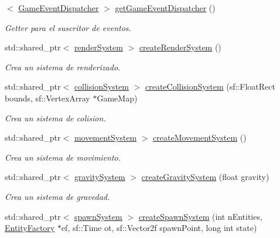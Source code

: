 \begin{DoxyCompactItemize}
$<$ \hyperlink{classant_1_1_game_event_dispatcher}{Game\+Event\+Dispatcher} $>$ \hyperlink{classant_1_1_system_factory_a33d785d8400849461d1e734c472308b4}{get\+Game\+Event\+Dispatcher} ()
\begin{DoxyCompactList}\small\item\em Getter para el suscritor de eventos. \end{DoxyCompactList}\item 
std\+::shared\+\_\+ptr$<$ \hyperlink{classant_1_1render_system}{render\+System} $>$ \hyperlink{classant_1_1_system_factory_a3d6ae5e15504796eab9f0ebd13cae354}{create\+Render\+System} ()
\begin{DoxyCompactList}\small\item\em Crea un sistema de renderizado. \end{DoxyCompactList}\item 
std\+::shared\+\_\+ptr$<$ \hyperlink{classant_1_1collision_system}{collision\+System} $>$ \hyperlink{classant_1_1_system_factory_aa962a3076d677e7ea258897cdefabd1e}{create\+Collision\+System} (sf\+::\+Float\+Rect bounds, sf\+::\+Vertex\+Array $\ast$Game\+Map)
\begin{DoxyCompactList}\small\item\em Crea un sistema de colision. \end{DoxyCompactList}\item 
std\+::shared\+\_\+ptr$<$ \hyperlink{classant_1_1movement_system}{movement\+System} $>$ \hyperlink{classant_1_1_system_factory_a69b79fce62ccf901996515e4528bc71d}{create\+Movement\+System} ()
\begin{DoxyCompactList}\small\item\em Crea un sistema de movimiento. \end{DoxyCompactList}\item 
std\+::shared\+\_\+ptr$<$ \hyperlink{classant_1_1gravity_system}{gravity\+System} $>$ \hyperlink{classant_1_1_system_factory_ae1012e7048bee97688a0db2f76723322}{create\+Gravity\+System} (float gravity)
\begin{DoxyCompactList}\small\item\em Crea un sistema de gravedad. \end{DoxyCompactList}\item 
std\+::shared\+\_\+ptr$<$ \hyperlink{classant_1_1spawn_system}{spawn\+System} $>$ \hyperlink{classant_1_1_system_factory_acf3fcbe08c0bb66a4a587cc4141b01a1}{create\+Spawn\+System} (int n\+Entities, \hyperlink{classant_1_1_entity_factory}{Entity\+Factory} $\ast$ef, sf\+::\+Time ot, sf\+::\+Vector2f spawn\+Point, long int state)

\end{DoxyCompactItemize}
